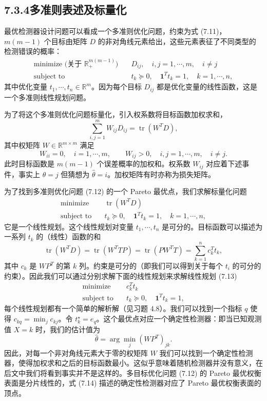 \documentclass[UTF8, 12pt, fontset=fandol, oneside]{ctexart}
\begin{document}
\subsection*{7.3.4\quad 多准则表述及标量化}

最优检测器设计问题可以看成一个多准则优化问题，约束为式 (7.11)，$m(m-1)$ 个目标由矩阵 $D$ 的非对角线元素给出，这些元素表征了不同类型的检测错误的概率：
\begin{equation}
\begin{aligned}
\text{minimize (关于 $\mathbb{R}_+^{m(m-1)}$)}\quad & D_{ij},\quad i,j=1,\cdots,m,\quad i\neq j\\
\text{subject to}\quad & t_k\succeq 0,\quad \mathbf{1}^Tt_k=1,\quad k=1,\cdots,n,
\end{aligned}
\tag{7.12}
\end{equation}
其中优化变量 $t_1,\cdots,t_n\in\mathbb{R}^m$。因为每个目标 $D_{ij}$ 都是优化变量的线性函数，这是一个多准则线性规划问题。

为了将这个多准则优化问题标量化，引入权系数将目标函数加权求和，
\[
\sum_{i,j=1}^m W_{ij}D_{ij}=\operatorname{tr}(W^TD),
\]
其中权矩阵 $W\in\mathbb{R}^{m\times m}$ 满足
\[
W_{ii}=0,\quad i=1,\cdots,m,\qquad
W_{ij}>0,\quad i,j=1,\cdots,m,\quad i\neq j.
\]
此时目标函数是 $m(m-1)$ 个误差概率的加权和。权系数 $W_{ij}$ 对应着下述事件，事实上 $\theta=j$ 但猜想为 $\hat{\theta}=i$。加权矩阵有时亦称为损失矩阵。

为了找到多准则优化问题 (7.12) 的一个 Pareto 最优点，我们求解标量化问题
\begin{equation}
\begin{aligned}
\text{minimize}\quad & \operatorname{tr}(W^TD)\\
\text{subject to}\quad & t_k\succeq 0,\quad \mathbf{1}^Tt_k=1,\quad k=1,\cdots,n,
\end{aligned}
\tag{7.13}
\end{equation}
它是一个线性规划。这个线性规划对变量 $t_1,\cdots,t_n$ 是可分的。目标函数可以描述为一系列 $t_k$ 的（线性）函数的和
\[
\operatorname{tr}(W^TD)=\operatorname{tr}(W^TTP)=\operatorname{tr}(PW^TT)=\sum_{k=1}^n c_k^Tt_k,
\]
其中 $c_k$ 是 $WP^T$ 的第 $k$ 列。约束是可分的（即我们可以得到关于每个 $t_i$ 的可分的约束）。因此我们可以通过分别求解下面的线性规划来求解线性规划 (7.13)
\[
\begin{aligned}
\text{minimize}\quad & c_k^Tt_k\\
\text{subject to}\quad & t_k\succeq 0,\quad \mathbf{1}^Tt_k=1,
\end{aligned}
\]
每个线性规划都有一个简单的解析解（见习题 4.8）。我们可以找到一个指标 $q$ 使得 $c_{kq}=\min_j c_{kj}$。令 $t_k^\star=e_q$。这个最优点对应一个确定性检测器：即当已知观测值 $X=k$ 时，我们的估计值为
\begin{equation}
\hat{\theta}=\arg\min_j(WP^T)_{jk}.
\tag{7.14}
\end{equation}
因此，对每一个非对角线元素大于零的权矩阵 $W$ 我们可以找到一个确定性检测器，使得加权求和之后的目标函数最小。这似乎意味着随机检测器并没有意义，在后文中我们将看到事实并不是这样的。多目标优化问题 (7.12) 的 Pareto 最优权衡表面是分片线性的，式 (7.14) 描述的确定性检测器对应了 Pareto 最优权衡表面的顶点。
\end{document}
